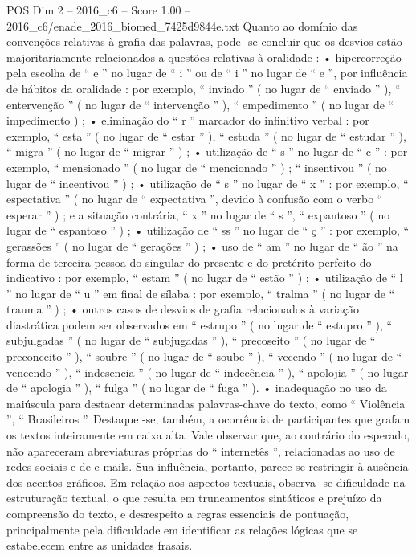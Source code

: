 \begin{textsample}{POS Dim 2 – 2016\_c6 – Score 1.00 – 2016\_c6/enade\_2016\_biomed\_7425d9844e.txt}
Quanto ao domínio das convenções relativas à grafia das palavras, pode -se concluir que os desvios estão majoritariamente relacionados a questões relativas à oralidade : • hipercorreção pela escolha de “ e ” no lugar de “ i ” ou de “ i ” no lugar de “ e ”, por influência de hábitos da oralidade : por exemplo, “ inviado ” ( no lugar de “ enviado ” ), “ entervenção ” ( no lugar de “ intervenção ” ), “ empedimento ” ( no lugar de “ impedimento ) ; • eliminação do “ r ” marcador do infinitivo verbal : por exemplo, “ esta ” ( no lugar de “ estar ” ), “ estuda ” ( no lugar de “ estudar ” ), “ migra ” ( no lugar de “ migrar ” ) ; • utilização de “ s ” no lugar de “ c ” : por exemplo, “ mensionado ” ( no lugar de “ mencionado ” ) ; “ insentivou ” ( no lugar de “ incentivou ” ) ; • utilização de “ s ” no lugar de “ x ” : por exemplo, “ espectativa ” ( no lugar de “ expectativa ”, devido à confusão com o verbo “ esperar ” ) ; e a situação contrária, “ x ” no lugar de “ s ”, “ expantoso ” ( no lugar de “ espantoso ” ) ; • utilização de “ ss ” no lugar de “ ç ” : por exemplo, “ gerassões ” ( no lugar de “ gerações ” ) ; • uso de “ am ” no lugar de “ ão ” na forma de terceira pessoa do singular do presente e do pretérito perfeito do indicativo : por exemplo, “ estam ” ( no lugar de “ estão ” ) ; • utilização de “ l ” no lugar de “ u ” em final de sílaba : por exemplo, “ tralma ” ( no lugar de “ trauma ” ) ; • outros casos de desvios de grafia relacionados à variação diastrática podem ser observados em “ estrupo ” ( no lugar de “ estupro ” ), “ subjulgadas ” ( no lugar de “ subjugadas ” ), “ precoseito ” ( no lugar de “ preconceito ” ), “ soubre ” ( no lugar de “ soube ” ), “ vecendo ” ( no lugar de “ vencendo ” ), “ indesencia ” ( no lugar de “ indecência ” ), “ apolojia ” ( no lugar de “ apologia ” ), “ fulga ” ( no lugar de “ fuga ” ). • inadequação no uso da maiúscula para destacar determinadas palavras-chave do texto, como “ Violência ”, “ Brasileiros ”.
Destaque -se, também, a ocorrência de participantes que grafam os textos inteiramente em caixa alta.
Vale observar que, ao contrário do esperado, não apareceram abreviaturas próprias do “ internetês ”, relacionadas ao uso de redes sociais e de e-mails.
Sua influência, portanto, parece se restringir à ausência dos acentos gráficos.
Em relação aos aspectos textuais, observa -se dificuldade na estruturação textual, o que resulta em truncamentos sintáticos e prejuízo da compreensão do texto, e desrespeito a regras essenciais de pontuação, principalmente pela dificuldade em identificar as relações lógicas que se estabelecem entre as unidades frasais.

\end{textsample}
